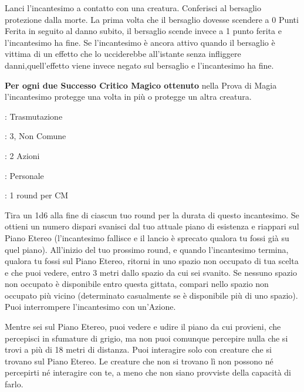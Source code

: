 \begin{multicols}{2}
Lanci l'incantesimo a contatto con una creatura. Conferisci al bersaglio protezione dalla morte. La prima volta che il bersaglio dovesse scendere a 0 Punti Ferita in seguito al danno subito, il bersaglio scende invece a 1 punto ferita e l'incantesimo ha fine. Se l'incantesimo è ancora attivo quando il bersaglio è vittima di un effetto che lo ucciderebbe all'istante senza infliggere danni,quell'effetto viene invece negato sul bersaglio e l'incantesimo ha fine.

\textbf{Per ogni due Successo Critico Magico ottenuto} nella Prova di Magia l'incantesimo protegge una volta in più o protegge un altra creatura.

\noindent\colorbox{OBSSgold!10}{
\begin{minipage}{0.95\linewidth}
\begin{description}[noitemsep, topsep=0pt, parsep=0pt, partopsep=0pt, leftmargin=0cm, labelwidth=1.3cm]
	\item[\textbf{Lista}]: Trasmutazione
	\item[\textbf{Livello}]: 3, Non Comune
	\item[\textbf{Lancio}]: 2 Azioni
	\item[\textbf{Gittata}]: Personale
	\item[\textbf{Durata}]: 1 round per CM
\end{description}
\end{minipage}}\smallskip

Tira un 1d6 alla fine di ciascun tuo round per la durata di questo incantesimo. Se ottieni un numero dispari svanisci dal tuo attuale piano di esistenza e riappari sul Piano Etereo (l'incantesimo fallisce e il lancio è sprecato qualora tu fossi già su quel piano). All'inizio del tuo prossimo round, e quando l'incantesimo termina, qualora tu fossi sul Piano Etereo, ritorni in uno spazio non occupato di tua scelta e che puoi vedere, entro 3 metri dallo spazio da cui sei svanito. Se nessuno spazio non occupato è disponibile entro questa gittata, compari nello spazio non occupato più vicino (determinato casualmente se è disponibile più di uno spazio). Puoi interrompere l'incantesimo con un'Azione.

Mentre sei sul Piano Etereo, puoi vedere e udire il piano da cui provieni, che percepisci in sfumature di grigio, ma non puoi comunque percepire nulla che si trovi a più di 18 metri di distanza. Puoi interagire solo con creature che si trovano sul Piano Etereo. Le creature che non si trovano lì non possono né percepirti né interagire con te, a meno che non siano provviste della capacità di farlo.


\end{multicols}
